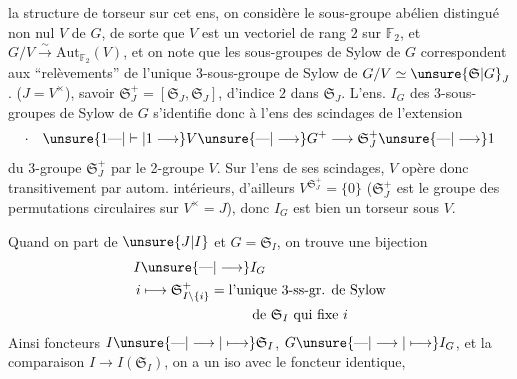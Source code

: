 la structure de torseur sur cet ens, on considère le sous-groupe abélien distingué  non nul $V$ de $G$, de sorte que $V$  est un vectoriel de rang $2$ sur $\mathbb{F}_2$, et $G/V\xrightarrow{\sim}\mathrm{Aut}_{\mathbb{F}_2}(V)$, et on note que les sous-groupes de Sylow de $G$ correspondent aux ``relèvements'' de l'unique 3-sous-groupe de Sylow de $G/V\simeq\unsure{\mathfrak{S}|G}_J$. ($J=V^\times$), savoir $\mathfrak{S}_J^+=[\mathfrak{S}_J,\mathfrak{S}_J]$, d'indice $2$ dans $\mathfrak{S}_J$.  L'ens. $I_G$ des 3-sous-groupes de Sylow de $G$ s'identifie donc à l'ens des scindages de l'extension
\[
\cdot\quad\unsure{1\text{---}|\vdash|1\longrightarrow} V\unsure{\text{---}|\longrightarrow} G^+\longrightarrow\mathfrak{S}_J^+\unsure{\text{---}|\longrightarrow}1
\]
du 3-groupe $\mathfrak{S}_J^+$ par le 2-groupe $V$. Sur l'ens de ses scindages, $V$ opère donc transitivement par autom. intérieurs, d'ailleurs $V^{\mathfrak{S}_J^+}=\{0\}$ ($\mathfrak{S}_J^+$ est le groupe des permutations circulaires sur $V^\times=J$), donc $I_G$ est bien un torseur sous $V$.

Quand on part de $\unsure{J|I}$ et  $G=\mathfrak{S}_I$, on trouve une bijection
\[
\begin{aligned}
I&\unsure{\text{---}|\longrightarrow} I_G\\
i&\longmapsto\mathfrak{S}_{I\setminus\{i\}}^+=\text{l'unique 3-ss-gr. de Sylow}\\
&\hspace{8em}\text{de }\mathfrak{S}_I\text{ qui fixe }i
\end{aligned}
\]
Ainsi   foncteurs $I\unsure{\text{---}|\longrightarrow|\longmapsto}\mathfrak{S}_I$, $G\unsure{\text{---}|\longrightarrow|\longmapsto} I_G$, et la comparaison $I\longrightarrow I(\mathfrak{S}_I)$, on a un iso avec le  foncteur identique,
